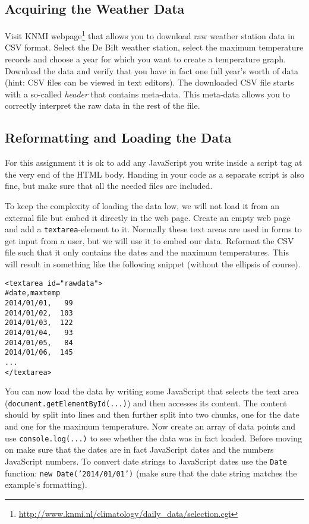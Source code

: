 \subsection{Acquiring the Weather Data}
Visit KNMI webpage\footnote{\url{http://www.knmi.nl/climatology/daily\_data/selection.cgi}} that allows you to download raw weather station data in
CSV format. Select the De Bilt weather station, select the maximum temperature
records and choose a year for which you want to create a temperature 
graph. Download the data and verify that you have in fact one full year's
worth of data (hint: CSV files can be viewed in text editors). The downloaded 
CSV file starts with a so-called \emph{header} that contains meta-data. This
meta-data allows you to correctly interpret the raw data in the rest of the file.


\subsection{Reformatting and Loading the Data}
For this assignment it is ok to add any JavaScript you write inside a script
tag at the very end of the HTML body. Handing in your code as a separate
script is also fine, but make sure that all the needed files are included.

To keep the complexity of loading the data low, we will not load it 
from an external file but embed it directly in the web page.
Create an empty web page and add a \texttt{textarea}-element to it. Normally 
these text areas are used in forms to get input from a user, but we will use
it to embed our data. Reformat the CSV file such that it only contains the
dates and the maximum temperatures. This will result in something like the
following snippet (without the ellipsis of course).
\begin{verbatim}
<textarea id="rawdata">
#date,maxtemp
2014/01/01,   99  
2014/01/02,  103 
2014/01/03,  122 
2014/01/04,   93  
2014/01/05,   84  
2014/01/06,  145 
...
</textarea>
\end{verbatim}



You can now load the data by writing some JavaScript that selects
the text area (\mbox{\texttt{document.getElementById(...)}}) and then 
accesses its content. The content should by split 
into lines and then further split into two chunks, one for the date and
one for the maximum temperature. Now create an array of data points 
and use \mbox{\texttt{console.log(...)}} to see whether the data was in fact
loaded. Before moving on make sure that the dates are in fact JavaScript
dates and the numbers JavaScript numbers. To convert date strings to
JavaScript dates use the \texttt{Date} function:
\mbox{\texttt{new Date('2014/01/01')}} (make sure that the date string
matches the example's formatting).

